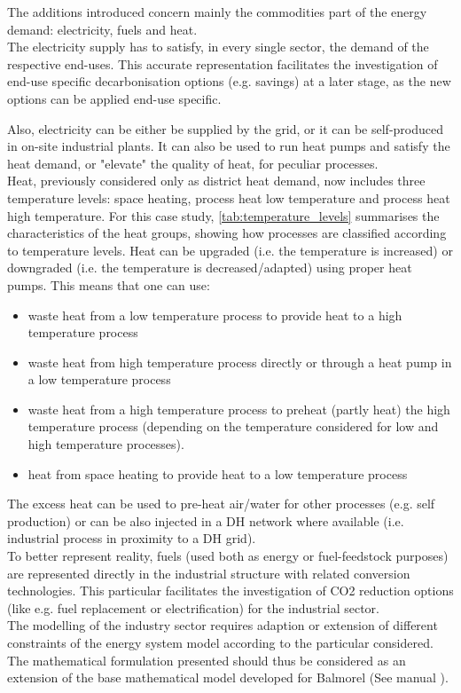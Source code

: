 \documentclass[review]{elsarticle}
\begin{document}
The additions introduced concern mainly the commodities part of the energy demand: electricity, fuels and heat.\\
The electricity supply has to satisfy, in every single sector, the demand of the respective end-uses. This accurate representation facilitates the investigation of end-use specific decarbonisation options (e.g. savings) at a later stage, as the new options can be applied end-use specific. 

Also, electricity can be either be supplied by the grid, or it can be self-produced in on-site industrial plants. It can also be used to run heat pumps and satisfy the heat demand, or "elevate" the quality of heat, for peculiar processes. \\
Heat, previously considered only as district heat demand, now includes three temperature levels: space heating, process heat low temperature and process heat high temperature. For this case study, \autoref{tab:temperature_levels} summarises the characteristics of the heat groups, showing how processes are classified according to temperature levels.
Heat can be upgraded (i.e. the temperature is increased) or downgraded (i.e. the temperature is decreased/adapted) using proper heat pumps. 
This means that one can use:
\begin{itemize}
    \item waste heat from a low temperature process to provide heat to a high temperature process
    \item waste heat from high temperature process directly or through a heat pump in a low temperature process
    \item waste heat from a high temperature process to preheat (partly heat) the high temperature process (depending on the temperature considered for low and high temperature processes). 
    \item heat from space heating to provide heat to a low temperature process
\end{itemize}
The excess heat can be used to pre-heat air/water for other processes (e.g. self production) or can be also injected in a DH network where available (i.e. industrial process in proximity to a DH grid). \\
To better represent reality, fuels (used both as energy or fuel-feedstock purposes) are represented directly in the industrial structure with related conversion technologies. This particular facilitates the investigation of CO2 reduction options (like e.g. fuel replacement or electrification) for the industrial sector. \\
%
The modelling of the industry sector requires adaption or extension of different constraints of the energy system model according to the particular considered. The mathematical formulation presented should thus be considered as an extension of the base mathematical model developed for Balmorel (See manual \cite{balmorel}).
\end{document}
